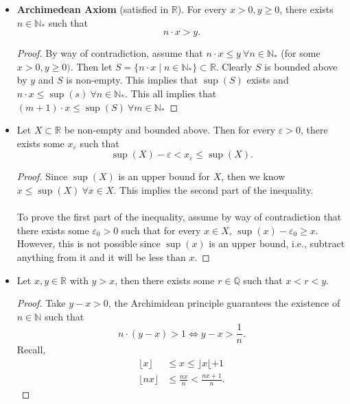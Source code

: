 \documentclass{article}
\newcommand{\Q}{\mathbb{Q}}
\newcommand{\R}{\mathbb{R}}
\newcommand{\N}{\mathbb{N}}
\newcommand{\set}[2]{\{ #1 \mid #2 \}}
\newcommand{\?}{\stackrel{?}{=}}
\theoremstyle{definition} %
\begin{document}
\begin{itemize}
    \item \textbf{Archimedean Axiom} (satisfied in $\R$). For every $x > 0, y \geq 0$, there exists $n \in \N_*$ such that
          $$n \cdot x > y.$$
          \begin{proof}
              By way of contradiction, assume that $n \cdot x \leq y \ \forall n \in \N_*$ (for some $x > 0, y \geq 0)$. Then let $S = \set{n \cdot x}{n \in \N_*} \subset \R$. Clearly $S$ is bounded above by $y$ and $S$ is non-empty. This implies that $\sup(S)$ exists and $n \cdot x \leq \sup(s) \ \forall n \in \N_*$. This all implies that $(m + 1) \cdot x \leq \sup(S) \ \forall m \in \N_*$
          \end{proof}
    \item[]
          \begin{lemma}
              Let $X \subset \R$ be non-empty and bounded above. Then for every $\varepsilon > 0$, there exists some $x_\varepsilon$ such that
              $$\sup(X) - \varepsilon < x_\varepsilon \leq \sup(X).$$
          \end{lemma}
          \begin{proof}
              Since $\sup(X)$ is an upper bound for $X$, then we know $x \leq \sup(X) \ \forall x \in X$. This implies the second part of the inequality. \\\\
              To prove the first part of the inequality, assume by way of contradiction that there exists some $\varepsilon_0 > 0$ such that for every $x \in X$, $\sup(x) - \varepsilon_0 \geq x$. However, this is not possible since $\sup(x)$ is an upper bound, i.e., subtract anything from it and it will be less than $x$.
          \end{proof}
    \item[]
          \begin{lemma}
              Let $x, y \in \R$ with $y > x$, then there exists some $r \in \Q$ such that $x < r < y$.
          \end{lemma}
          \begin{proof}
              Take $y - x > 0$, the Archimidean principle guarantees the existence of $n \in \N$ such that
              $$n \cdot (y - x) > 1 \iff y - x > \frac{1}{n}.$$
              Recall,
              \begin{align*}
                  \lfloor x \rfloor  & \leq x \leq \rfloor x \lfloor + 1     \\
                  \lfloor nx \rfloor & \leq \frac{nx}{n} < \frac{nx + 1}{n}.
              \end{align*}

\end{proof}
\end{itemize}
\end{document}
